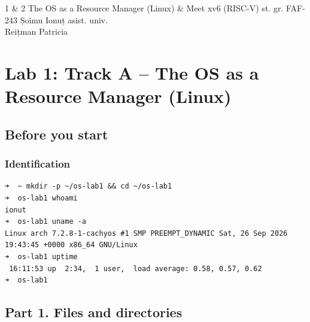 \documentclass{labreport}
\begin{document}
\labtitle
    {1 \& 2}
    {The OS as a Resource Manager (Linux) \& Meet xv6 (RISC-V)}
    {st. gr. FAF-243}
    {Șoimu Ionuț}
    {asist. univ.\\[0.15cm] Reițman Patricia}

\tableofcontents
\newpage

\section{Lab 1: Track A -- The OS as a Resource Manager (Linux)}

\subsection{Before you start}

\subsubsection*{Identification}
\begin{lstlisting}[style=bash]
➜  ~ mkdir -p ~/os-lab1 && cd ~/os-lab1
➜  os-lab1 whoami
ionut
➜  os-lab1 uname -a
Linux arch 7.2.8-1-cachyos #1 SMP PREEMPT_DYNAMIC Sat, 26 Sep 2026 19:43:45 +0000 x86_64 GNU/Linux
➜  os-lab1 uptime
 16:11:53 up  2:34,  1 user,  load average: 0.58, 0.57, 0.62
➜  os-lab1
\end{lstlisting}

\subsection{Part 1. Files and directories}
\end{document}
